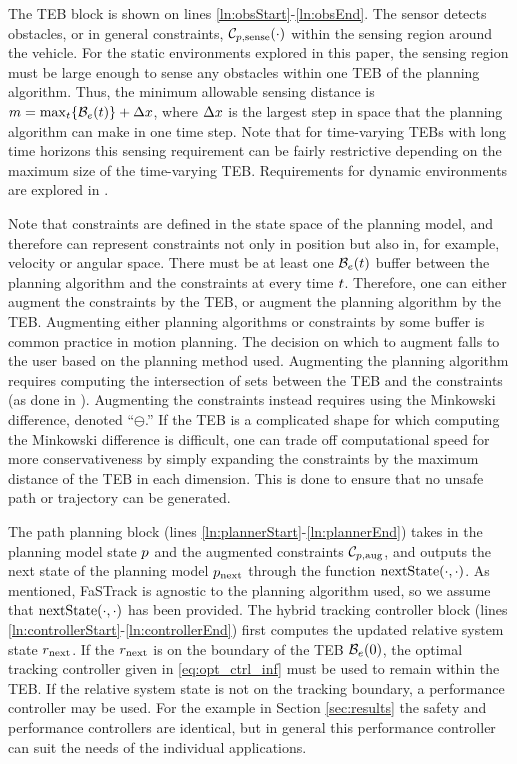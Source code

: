 The TEB block is shown on lines \ref{ln:obsStart}-\ref{ln:obsEnd}. 
The sensor detects obstacles, or in general constraints, $\mathcal C_{p,\text{sense}}(\cdot)$ within the sensing region around the vehicle.  For the static environments explored in this paper, the sensing region must be large enough to sense any obstacles within one TEB of the planning algorithm.  Thus, the minimum allowable sensing distance is $m = \max_{t}\{\mathcal B_e(t)\} + \Delta x$, where $\Delta x$ is the largest step in space that the planning algorithm can make in one time step.  Note that for time-varying TEBs with long time horizons this sensing requirement can be fairly restrictive depending on the maximum size of the time-varying TEB.  Requirements for dynamic environments are explored in \cite{fisac2018probabilistically, bajcsy2018scalable}.

Note that constraints are defined in the state space of the planning model, and therefore can represent constraints not only in position but also in, for example, velocity or angular space. There must be at least one $\mathcal B_e(t)$ buffer between the planning algorithm and the constraints at every time $t$.  Therefore, one can either augment the constraints by the TEB, or augment the planning algorithm by the TEB.  
Augmenting either planning algorithms or constraints by some buffer is common practice in motion planning.  The decision on which to augment falls to the user based on the planning method used.  Augmenting the planning algorithm requires computing the intersection of sets between the TEB and the constraints (as done in \cite{fisac2018probabilistically, bajcsy2018scalable}). Augmenting the constraints instead requires using the Minkowski difference, denoted ``$\ominus$.''  If the TEB is a complicated shape for which computing the Minkowski difference is difficult, one can trade off computational speed for more conservativeness by simply expanding the constraints by the maximum distance of the TEB in each dimension.
This is done to ensure that no unsafe path or trajectory can be generated.

The path planning block (lines \ref{ln:plannerStart}-\ref{ln:plannerEnd}) takes in the planning model state $p$ and the augmented constraints $\mathcal C_{p,\text{aug}}$, and outputs the next state of the planning model $p_\text{next}$ through the function $\text{nextState}(\cdot, \cdot)$.
As mentioned, FaSTrack is agnostic to the planning algorithm used, so we assume that $\text{nextState}(\cdot, \cdot)$ has been provided.
The hybrid tracking controller block (lines \ref{ln:controllerStart}-\ref{ln:controllerEnd}) first computes the updated relative system state $r_\text{next}$. 
If the $r_\text{next}$ is on the boundary of the TEB $\mathcal B_e(0)$, the optimal tracking controller given in \eqref{eq:opt_ctrl_inf} must be used to remain within the TEB. 
If the relative system state is not on the tracking boundary, a performance controller may be used. For the example in Section \ref{sec:results} the safety and performance controllers are identical, but in general this performance controller can suit the needs of the individual applications.

